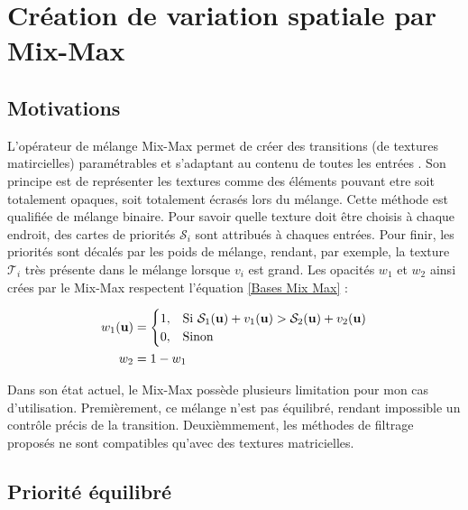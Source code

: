\documentclass{article}
\begin{document}
\newpage

\section{Création de variation spatiale par Mix-Max}

\subsection{Motivations}

L'opérateur de mélange Mix-Max permet de créer des transitions (de textures
matircielles) paramétrables et s'adaptant au contenu de toutes les entrées
\cite{mixmax}. Son principe est de représenter les textures comme des éléments
pouvant etre soit totalement opaques, soit totalement écrasés lors du mélange.
Cette méthode est qualifiée de mélange binaire. Pour savoir quelle texture doit
être choisis à chaque endroit, des cartes de priorités $\mathcal{S}_i$ sont
attribués à chaques entrées. Pour finir, les priorités sont décalés par les
poids de mélange, rendant, par exemple, la texture $\mathcal{T}_i$ très
présente dans le mélange lorsque $v_i$ est grand. Les opacités $w_1$ et $w_2$
ainsi crées par le Mix-Max respectent l'équation \ref{Bases Mix Max}
\cite{mixmax} :

\begin{equation}\centering\label{Bases Mix Max}
    \begin{split}
        w_1(\mathbf{u}) &= \begin{cases}
            1, & \text{Si } \mathcal{S}_1(\mathbf{u})  + v_1(\mathbf{u})  > \mathcal{S}_2(\mathbf{u})  + v_2(\mathbf{u}) \\
            0, & \text{Sinon}
        \end{cases} \\
        w_2 &= 1-w_1
    \end{split}
\end{equation}

Dans son état actuel, le Mix-Max possède plusieurs limitation pour mon cas
d'utilisation. Premièrement, ce mélange n'est pas équilibré, rendant impossible
un contrôle précis de la transition. Deuxièmmement, les méthodes de filtrage
proposés ne sont compatibles qu'avec des textures matricielles.

\subsection{Priorité équilibré}
\end{document}
